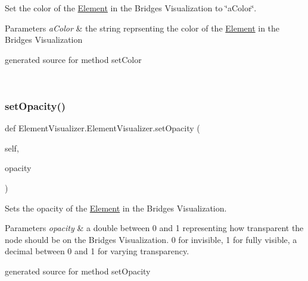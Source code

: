 Set the color of the \hyperlink{namespace_element}{Element} in the Bridges Visualization to \char`\"{}a\+Color\char`\"{}. 


\begin{DoxyParams}{Parameters}
{\em a\+Color} & the string reprsenting the color of the \hyperlink{namespace_element}{Element} in the Bridges Visualization\begin{DoxyVerb}generated source for method setColor \end{DoxyVerb}
 \\
\hline
\end{DoxyParams}
\hypertarget{class_element_visualizer_1_1_element_visualizer_aea9cae4dc99c63ee017ad1b7becd36fb}{}\label{class_element_visualizer_1_1_element_visualizer_aea9cae4dc99c63ee017ad1b7becd36fb} 
\subsubsection{\texorpdfstring{set\+Opacity()}{setOpacity()}}
{\footnotesize\ttfamily def Element\+Visualizer.\+Element\+Visualizer.\+set\+Opacity (\begin{DoxyParamCaption}\item[{}]{self,  }\item[{}]{opacity }\end{DoxyParamCaption})}



Sets the opacity of the \hyperlink{namespace_element}{Element} in the Bridges Visualization. 


\begin{DoxyParams}{Parameters}
{\em opacity} & a double between 0 and 1 representing how transparent the node should be on the Bridges Visualization. 0 for invisible, 1 for fully visible, a decimal between 0 and 1 for varying transparency.\begin{DoxyVerb}generated source for method setOpacity \end{DoxyVerb}
 \\
\hline
\end{DoxyParams}
\hypertarget{class_element_visualizer_1_1_element_visualizer_aee33522cc2e7dccf6471ba0fb6b8066d}{}\label{class_element_visualizer_1_1_element_visualizer_aee33522cc2e7dccf6471ba0fb6b8066d} 
